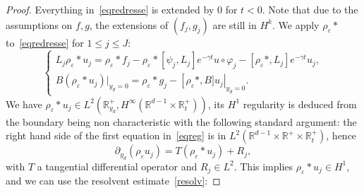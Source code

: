 \documentclass[AHL,Unicode,longabstracts,published]{cedram}
\newcommand{\R}{\mathbb{R}}
\begin{document}
\begin{proof}
Everything in~\eqref{eqredresse} is extended by $0$ for $t<0$. Note that due to the assumptions on $f,g$, the extensions of $(f_j,g_j)$ are still in $H^k$. We apply $\rho_\varepsilon*$ to~\eqref{eqredresse} for $1\leq j\leq J$:
\begin{equation}\label{eqreg}
\left\{
\begin{array}{ll}
L_j\rho_\varepsilon*u_j=\rho_\varepsilon*f_j-\rho_\varepsilon*\left[\psi_j,L_j\right]e^{-\gamma t}u\circ
\varphi_j-\left[\rho_\varepsilon*,L_j\right]e^{-\gamma t}u_j,\\
B\left(\rho_\varepsilon*u_j\right)|_{y_d=0}=\rho_\varepsilon*g_j -\left[\rho_\varepsilon*,B]u_j\right|_{y_d=0}.
\end{array}
\right.
\end{equation}
We have $\rho_\varepsilon*u_j\in L^2(\R^+_{y_d},H^\infty(\R^{d-1}\times \R_t^+))$, its $H^1$ regularity is deduced from the boundary being non characteristic with the following standard argument: the right hand side of the first equation in~\eqref{eqreg} is in $L^2(\R^{d-1}\times
\R^+\times \R_t^+)$, hence
\begin{equation}\label{characgain}
\partial_{y_d}(\rho_\varepsilon u_j)=T\left(\rho_\varepsilon* u_j\right)+R_j,
\end{equation}
with $T$ a tangential differential operator and $R_j\in L^2$. This implies $\rho_\varepsilon*u_j
\in H^1$, and we can use the resolvent estimate~\eqref{resolv}:



\end{proof}
\end{document}
